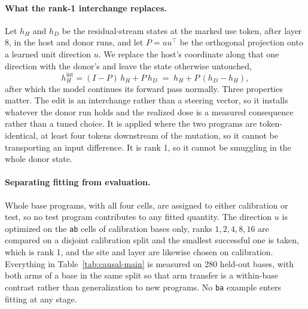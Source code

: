 \documentclass{article}
\begin{document}
\paragraph{What the rank-1 interchange replaces.}
Let $h_H$ and $h_D$ be the residual-stream states at the marked use token, after layer 8, in the host and donor runs, and let $P=uu^{\top}$ be the orthogonal projection onto a learned unit direction $u$. We replace the host's coordinate along that one direction with the donor's and leave the state otherwise untouched,
\begin{equation}
 h_H^{\mathrm{int}}=(I-P)\,h_H+P\,h_D \;=\; h_H+P\,(h_D-h_H),
 \label{eq:interchange}
\end{equation}
after which the model continues its forward pass normally. Three properties matter. The edit is an interchange rather than a steering vector, so it installs whatever the donor run holds and the realized dose is a measured consequence rather than a tuned choice. It is applied where the two programs are token-identical, at least four tokens downstream of the mutation, so it cannot be transporting an input difference. It is rank 1, so it cannot be smuggling in the whole donor state.

\paragraph{Separating fitting from evaluation.}
Whole base programs, with all four cells, are assigned to either calibration or test, so no test program contributes to any fitted quantity. The direction $u$ is optimized on the \texttt{ab} cells of calibration bases only, ranks $1,2,4,8,16$ are compared on a disjoint calibration split and the smallest successful one is taken, which is rank 1, and the site and layer are likewise chosen on calibration. Everything in Table~\ref{tab:causal-main} is measured on 280 held-out bases, with both arms of a base in the same split so that arm transfer is a within-base contrast rather than generalization to new programs. No \texttt{ba} example enters fitting at any stage.
\end{document}
